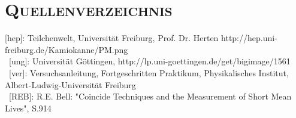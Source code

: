 \clearpage
\section{\textsc{Quellenverzeichnis}}

[hep]: Teilchenwelt, Universität Freiburg, Prof. Dr. Herten http://hep.uni-freiburg.de/Kamiokanne/PM.png \\
~[ung]: Universität Göttingen, http://lp.uni-goettingen.de/get/bigimage/1561\\
~[ver]: Versuchsanleitung, Fortgeschritten Praktikum, Physikalisches Institut, Albert-Ludwig-Universität Freiburg\\
~[REB]: R.E. Bell: "Coincide Techniques and the Measurement of Short Mean Lives", S.914
